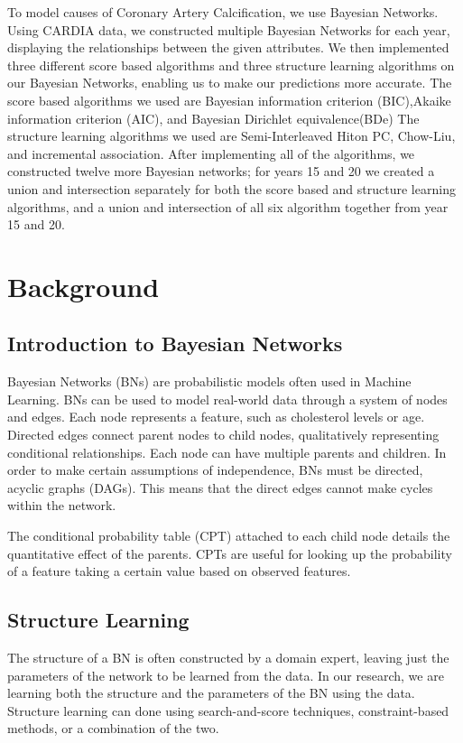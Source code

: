 \documentclass[letterpaper]{article}
\begin{document}
To model causes of Coronary Artery Calcification, we use Bayesian Networks.  Using CARDIA data, we constructed multiple Bayesian Networks for each year, displaying the relationships between the given attributes.  We then implemented three different score based algorithms and three structure learning algorithms on our Bayesian Networks, enabling us to make our predictions more accurate.  The score based algorithms we used are Bayesian information criterion (BIC),Akaike information criterion (AIC), and Bayesian Dirichlet equivalence(BDe)  The structure learning algorithms we used are Semi-Interleaved Hiton PC, Chow-Liu, and incremental association.  After implementing all of the algorithms, we constructed twelve more Bayesian networks; for years 15 and 20 we created a union and intersection separately for both the score based and structure learning algorithms, and a union and intersection of all six algorithm together from year 15 and 20.


\setcounter{secnumdepth}{2}
\section{Background}
\subsection{Introduction to Bayesian Networks}

Bayesian Networks (BNs) are probabilistic models often used in Machine Learning. BNs can be used to model real-world data through a system of nodes and edges. Each node represents a feature, such as cholesterol levels or age. Directed edges connect parent nodes to child nodes, qualitatively representing conditional relationships. Each node can have multiple parents and children. In order to make certain assumptions of independence, BNs must be directed, acyclic graphs (DAGs). This means that the direct edges cannot make cycles within the network.\cite{Russell1995} 

The conditional probability table (CPT) attached to each child node details the quantitative effect of the parents. CPTs are useful for looking up the probability of a feature taking a certain value based on observed features. 

\subsection{Structure Learning}
The structure of a BN is often constructed by a domain expert, leaving just the parameters of the network to be learned from the data. In our research, we are learning both the structure and the parameters of the BN using the data. Structure learning can done using search-and-score techniques, constraint-based methods, or a combination of the two. \cite{Vol2012}  
\end{document}
